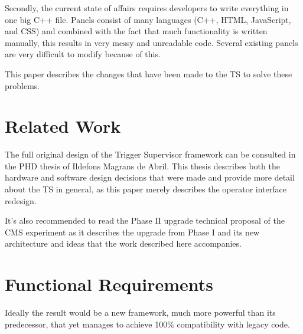 \documentclass[journal,compsoc,a4paper]{IEEEtran}
\begin{document}
Secondly, the current state of affairs requires developers to write everything
in one big C++ file. Panels consist of many languages (C++, HTML, JavaScript,
and CSS) and combined with the fact that much functionality is written manually,
this results in very messy and unreadable code.
Several existing panels are very difficult to modify because of this.

This paper describes the changes that have been made to the TS to solve these
problems.

\section{Related Work}
The full original design of the Trigger Supervisor framework can be consulted in
the PHD thesis of Ildefons Magrans de Abril\cite{TS_PHD}. This thesis describes
both the hardware and software design decisions that were made and provide more
detail about the TS in general, as this paper merely describes the operator
interface redesign.

It's also recommended to read the Phase II upgrade technical proposal of the
CMS experiment\cite{TS_Phase2} as it describes the upgrade from Phase I
\cite{CMS_Experiment} and its new architecture and ideas that the work described
here accompanies.


\section{Functional Requirements}
Ideally the result would be a new framework, much more powerful than its
predecessor, that yet manages to achieve 100\% compatibility with legacy code.
\end{document}
